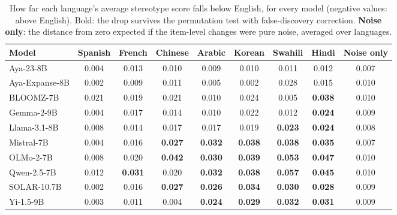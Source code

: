 \begin{table}[t]
\centering
\small
\begin{tabular}{lcccccccc}
\toprule
\textbf{Model} & \textbf{Spanish} & \textbf{French} & \textbf{Chinese} & \textbf{Arabic} & \textbf{Korean} & \textbf{Swahili} & \textbf{Hindi} & \textbf{Noise only} \\
\midrule
Aya-23-8B & 0.004 & 0.013 & 0.010 & 0.009 & 0.010 & 0.011 & 0.012 & 0.007 \\
Aya-Expanse-8B & 0.002 & 0.009 & 0.011 & 0.005 & 0.002 & 0.028 & 0.015 & 0.010 \\
BLOOMZ-7B & 0.021 & 0.019 & 0.021 & 0.010 & 0.024 & 0.005 & \textbf{0.038} & 0.010 \\
Gemma-2-9B & 0.004 & 0.017 & 0.014 & 0.010 & 0.022 & 0.012 & \textbf{0.024} & 0.009 \\
Llama-3.1-8B & 0.008 & 0.014 & 0.017 & 0.017 & 0.019 & \textbf{0.023} & \textbf{0.024} & 0.008 \\
Mistral-7B & 0.004 & 0.016 & \textbf{0.027} & \textbf{0.032} & \textbf{0.038} & \textbf{0.038} & \textbf{0.035} & 0.007 \\
OLMo-2-7B & 0.008 & 0.020 & \textbf{0.042} & \textbf{0.030} & \textbf{0.039} & \textbf{0.053} & \textbf{0.047} & 0.010 \\
Qwen-2.5-7B & 0.012 & \textbf{0.031} & 0.020 & \textbf{0.032} & \textbf{0.038} & \textbf{0.057} & \textbf{0.045} & 0.010 \\
SOLAR-10.7B & 0.002 & 0.016 & \textbf{0.027} & \textbf{0.026} & \textbf{0.034} & \textbf{0.030} & \textbf{0.028} & 0.009 \\
Yi-1.5-9B & 0.003 & 0.011 & 0.004 & \textbf{0.024} & \textbf{0.029} & \textbf{0.032} & \textbf{0.031} & 0.009 \\
\bottomrule
\end{tabular}
\caption{How far each language's average stereotype score falls below English, for every model (negative values: above English). Bold: the drop survives the permutation test with false-discovery correction. \textbf{Noise only}: the distance from zero expected if the item-level changes were pure noise, averaged over languages.}
\label{tab:gap_matrix}
\end{table}
